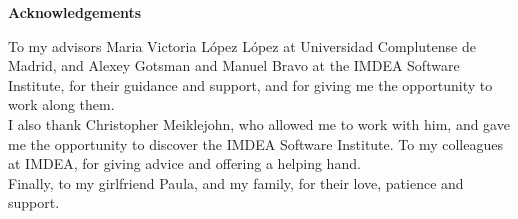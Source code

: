 \newpage

\begin{center}
{\bf \Huge Acknowledgements}
\end{center}

\vspace{1cm}

To my advisors Maria Victoria López López at Universidad Complutense de Madrid, and Alexey Gotsman and Manuel Bravo at the IMDEA Software Institute, for their guidance and support, and for giving me the opportunity to work along them.\\

I also thank Christopher Meiklejohn, who allowed me to work with him, and gave me the opportunity to discover the IMDEA Software Institute. To my colleagues at IMDEA, for giving advice and offering a helping hand.\\

Finally, to my girlfriend Paula, and my family, for their love, patience and support.\\
